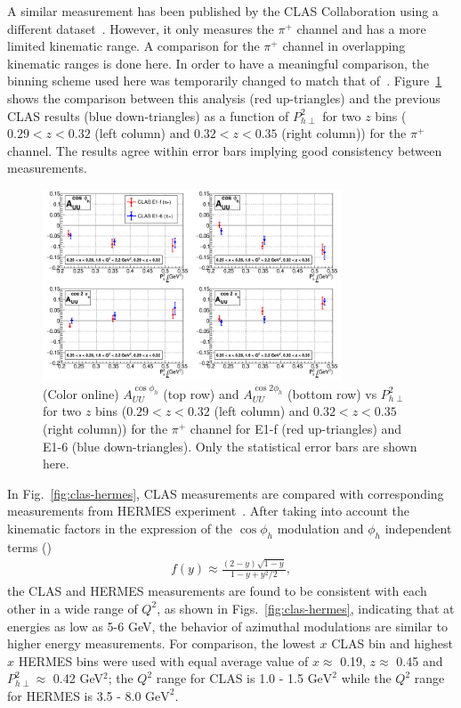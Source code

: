 \documentclass[aps,prl,twocolumn,showpacs,superscriptaddress,groupedaddress]{revtex4-1}  %
\newcommand{\Phperp}{P_{h\perp}}
\newcommand{\xbj}{x}
\begin{document}
A similar measurement has been published by the CLAS Collaboration using a different dataset~\cite{Osipenko:2008rv}.
However, it only measures the $\pi^+$ channel and has a more limited kinematic range.
A comparison for the $\pi^+$ channel in overlapping kinematic ranges is done here.
In order to have a meaningful comparison, the binning scheme used here was temporarily changed to match that of~\cite{Osipenko:2008rv}.
Figure~\ref{fig:osipenkoComparisonVPT2_2zBins} shows the comparison between this analysis (red up-triangles) and the previous CLAS results (blue down-triangles) as a function of $\Phperp^2$ for two $z$ bins ($0.29 < z < 0.32$ (left column) and $0.32 < z < 0.35$ (right column)) for the $\pi^+$ channel.
The results agree within error bars implying good consistency between measurements.
%
\begin{figure}[htp]
\centering
\includegraphics[width=3.5in]{plots/osipenkoComparisonVPT2_2zBins.png}
\caption{(Color online) $A_{UU}^{\cos \phi_h}$ (top row) and $A_{UU}^{\cos 2\phi_h}$ (bottom row) vs $P_{h\perp}^2$ for two $z$ bins ($0.29 < z < 0.32$ (left column) and $0.32 < z < 0.35$ (right column)) for the $\pi^+$ channel for E1-f (red up-triangles) and E1-6 (blue down-triangles). Only the statistical error bars are shown here.}
\label{fig:osipenkoComparisonVPT2_2zBins}
\end{figure}

In Fig.~\ref{fig:clas-hermes}, CLAS measurements are compared with corresponding measurements from HERMES experiment~\cite{Airapetian:2012yg}.
After taking into account the kinematic factors in the expression
of the $\cos\phi_h$ modulation and $\phi_h$ independent terms (\cite{Bacchetta:2006tn})
\begin{eqnarray}
f(y)\approx \frac{(2-y)\sqrt{1-y}}{1-y+y^{2}/2} ,
\label{fy}
\end{eqnarray}
the CLAS and HERMES measurements are found to 
be consistent with each other in a wide range of $Q^2$, as shown in Figs.~\ref{fig:clas-hermes}, indicating that at energies as low as 5-6 GeV, the
behavior of azimuthal modulations are similar to higher energy measurements. 
For comparison, the lowest $\xbj$ CLAS bin and highest $\xbj$ HERMES bins were used with equal average value of $\xbj\approx$ 0.19, $z\approx$ 0.45 and $\Phperp^2 \approx$ 0.42 GeV$^2$;
the $Q^2$ range for CLAS is 1.0 - 1.5 $\text{GeV}^2$ while the $Q^2$ range for HERMES is 3.5 - 8.0 $\text{GeV}^2$.
\end{document}
